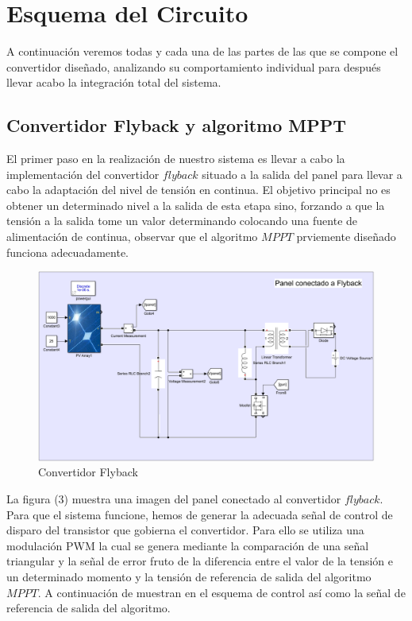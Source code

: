 \documentclass[	DIV=calc,%
							paper=letter,%
							fontsize=12pt%
                            ]{scrartcl}	 					%
\begin{document}
\newpage

\section{Esquema del Circuito}

A continuación veremos todas y cada una de las partes de las que se compone el convertidor diseñado, analizando su comportamiento individual para después llevar acabo la integración total del sistema.

\subsection{Convertidor Flyback y algoritmo MPPT}

El primer paso en la realización de nuestro sistema es llevar a cabo la implementación del convertidor $flyback$ situado a la salida del panel para llevar a cabo la adaptación del nivel de tensión en continua. El objetivo principal no es obtener un determinado nivel a la salida de esta etapa sino, forzando a que la tensión a la salida tome un valor determinando colocando una fuente de alimentación de continua, observar que el algoritmo $MPPT$ prviemente diseñado funciona adecuadamente.

\begin{figure}[h]
\centering
\includegraphics[scale=0.5]{cir_fly}
\caption{Convertidor Flyback}
\end{figure}

\newpage

La figura (3) muestra una imagen del panel conectado al convertidor $flyback$. Para que el sistema funcione, hemos de generar la adecuada señal de control de disparo del transistor que gobierna el convertidor. Para ello se utiliza una modulación PWM la cual se genera mediante la comparación de una señal triangular y la señal de error fruto de la diferencia entre el valor de la tensión e un determinado momento y la tensión de referencia de salida del algoritmo $MPPT$. A continuación de muestran en el esquema de control así como la señal de referencia de salida del algoritmo.
\end{document}
